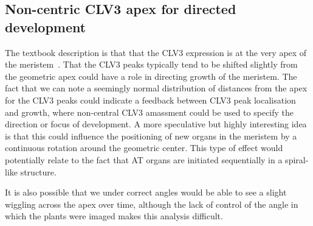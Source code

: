 \subsection{Non-centric CLV3 apex for directed development}
The textbook description is that that the CLV3 expression is at the very apex of
the meristem~\cite{clark2001cell}.  
That the CLV3 peaks typically tend to be shifted slightly from the geometric
apex could have a role in directing growth of the meristem. The fact that we
can note a seemingly normal distribution of distances from the apex for the CLV3
peaks could indicate a feedback between CLV3 peak localisation and growth, where
non-central CLV3 amassment could be used to specify the direction or focus of development.
A more speculative but highly interesting idea is
that this could influence the positioning of new organs in the meristem by a
continuous rotation around the geometric center. This type of effect would
potentially relate to the fact that AT organs are initiated sequentially in a
spiral-like structure.

It is also possible that we under correct angles would be able to see a
slight wiggling across the apex over time, although the lack of control of the
angle in which the plants were imaged makes this analysis difficult.  

